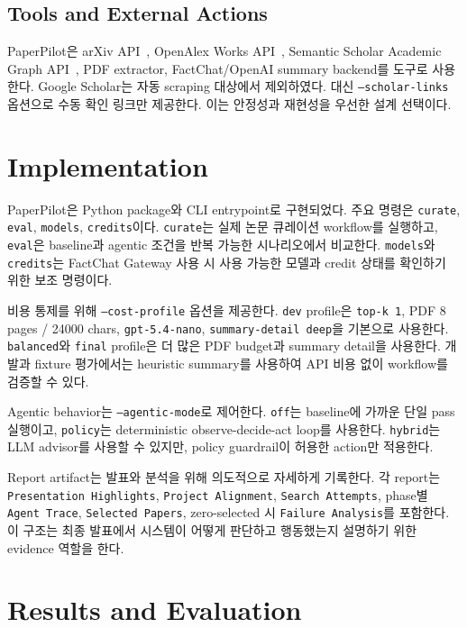 \documentclass[sigconf,nonacm]{acmart}
\begin{document}
\subsection{Tools and External Actions}

PaperPilot은 arXiv API~\cite{arxivapi}, OpenAlex Works API~\cite{openalex}, Semantic Scholar Academic Graph API~\cite{semanticscholar}, PDF extractor, FactChat/OpenAI summary backend를 도구로 사용한다. Google Scholar는 자동 scraping 대상에서 제외하였다. 대신 \texttt{--scholar-links} 옵션으로 수동 확인 링크만 제공한다. 이는 안정성과 재현성을 우선한 설계 선택이다.

\section{Implementation}

PaperPilot은 Python package와 CLI entrypoint로 구현되었다. 주요 명령은 \texttt{curate}, \texttt{eval}, \texttt{models}, \texttt{credits}이다. \texttt{curate}는 실제 논문 큐레이션 workflow를 실행하고, \texttt{eval}은 baseline과 agentic 조건을 반복 가능한 시나리오에서 비교한다. \texttt{models}와 \texttt{credits}는 FactChat Gateway 사용 시 사용 가능한 모델과 credit 상태를 확인하기 위한 보조 명령이다.

비용 통제를 위해 \texttt{--cost-profile} 옵션을 제공한다. \texttt{dev} profile은 \texttt{top-k 1}, PDF 8 pages / 24000 chars, \texttt{gpt-5.4-nano}, \texttt{summary-detail deep}을 기본으로 사용한다. \texttt{balanced}와 \texttt{final} profile은 더 많은 PDF budget과 summary detail을 사용한다. 개발과 fixture 평가에서는 heuristic summary를 사용하여 API 비용 없이 workflow를 검증할 수 있다.

Agentic behavior는 \texttt{--agentic-mode}로 제어한다. \texttt{off}는 baseline에 가까운 단일 pass 실행이고, \texttt{policy}는 deterministic observe-decide-act loop를 사용한다. \texttt{hybrid}는 LLM advisor를 사용할 수 있지만, policy guardrail이 허용한 action만 적용한다.

Report artifact는 발표와 분석을 위해 의도적으로 자세하게 기록한다. 각 report는 \texttt{Presentation Highlights}, \texttt{Project Alignment}, \texttt{Search Attempts}, phase별 \texttt{Agent Trace}, \texttt{Selected Papers}, zero-selected 시 \texttt{Failure Analysis}를 포함한다. 이 구조는 최종 발표에서 시스템이 어떻게 판단하고 행동했는지 설명하기 위한 evidence 역할을 한다.

\section{Results and Evaluation}
\end{document}

